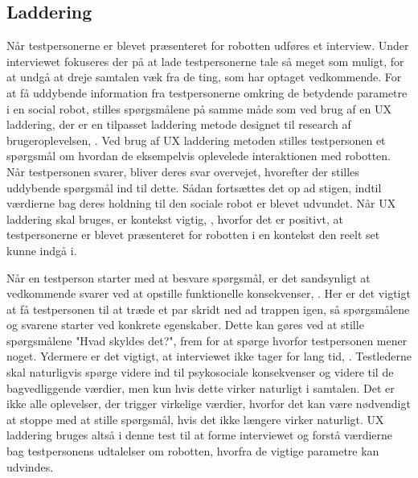 \subsection{Laddering}
\label{ParametreLaddering}
%
Når testpersonerne er blevet præsenteret for robotten udføres et interview. Under interviewet fokuseres der på at lade testpersonerne tale så meget som muligt, for at undgå at dreje samtalen væk fra de ting, som har optaget vedkommende. For at få uddybende information fra testpersonerne omkring de betydende parametre i en social robot, stilles spørgsmålene på samme måde som ved brug af en UX laddering, der er en tilpasset laddering metode designet til research af brugeroplevelsen, \parencite[ss. 3-4]{PDF:LadderingTheUserExperience}. Ved brug af UX laddering metoden stilles testpersonen et spørgsmål om hvordan de eksempelvis oplevelede interaktionen med robotten. Når testpersonen svarer, bliver deres svar overvejet, hvorefter der stilles uddybende spørgsmål ind til dette. Sådan fortsættes det op ad stigen, indtil værdierne bag deres holdning til den sociale robot er blevet udvundet. Når UX laddering skal bruges, er kontekst vigtig, \parencite[s. 3]{PDF:LadderingTheUserExperience}, hvorfor det er positivt, at testpersonerne er blevet præsenteret for robotten i en kontekst den reelt set kunne indgå i. 

Når en testperson starter med at besvare spørgsmål, er det sandsynligt at vedkommende svarer ved at opstille funktionelle konsekvenser, \parencite[s. 3]{PDF:LadderingTheUserExperience}. Her er det vigtigt at få testpersonen til at træde et par skridt ned ad trappen igen, så spørgsmålene og svarene starter ved konkrete egenskaber. Dette kan gøres ved at stille spørgsmålene "Hvad skyldes det?", frem for at spørge hvorfor testpersonen mener noget. Ydermere er det vigtigt, at interviewet ikke tager for lang tid, \parencite[s. 4]{PDF:LadderingTheUserExperience}. Testlederne skal naturligvis spørge videre ind til psykosociale konsekvenser og videre til de bagvedliggende værdier, men kun hvis dette virker naturligt i samtalen. Det er ikke alle oplevelser, der trigger virkelige værdier, hvorfor det kan være nødvendigt at stoppe med at stille spørgsmål, hvis det ikke længere virker naturligt. \blankline
%
UX laddering bruges altså i denne test til at forme interviewet og forstå værdierne bag testpersonens udtalelser om robotten, hvorfra de vigtige parametre kan udvindes.

